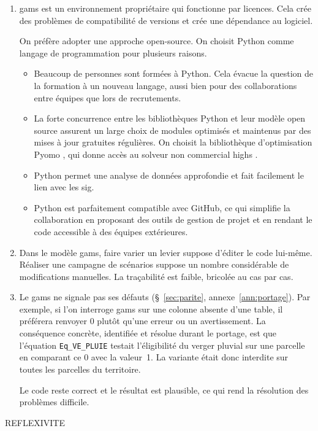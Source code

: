 \begin{enumerate}[leftmargin=1.6em,itemsep=6pt]

\item \gls{gams} est un environnement propriétaire qui fonctionne par licences. Cela crée des
problèmes de compatibilité de versions et crée une dépendance au logiciel.

On préfère adopter une approche open-source. On choisit Python comme langage de programmation
pour plusieurs raisons.

\begin{itemize}[leftmargin=1.2em,itemsep=3pt]
  \item Beaucoup de personnes sont formées à Python. Cela évacue la question de la formation à un
    nouveau langage, aussi bien pour des collaborations entre équipes que lors de recrutements.
  \item La forte concurrence entre les bibliothèques Python et leur modèle open source assurent
    un large choix de modules optimisés et maintenus par des mises à jour gratuites régulières.
    On choisit la bibliothèque d'optimisation Pyomo \parencite{pyomo2021}, qui donne accès au
    solveur non commercial \gls{highs} \parencite{highs2018}.
  \item Python permet une analyse de données approfondie et fait facilement le lien avec les
    \gls{sig}.
  \item Python est parfaitement compatible avec GitHub, ce qui simplifie la collaboration en
    proposant des outils de gestion de projet et en rendant le code accessible à des équipes
    extérieures.
\end{itemize}

\item Dans le modèle \gls{gams}, faire varier un levier suppose d'éditer le code lui-même.
Réaliser une campagne de scénarios suppose un nombre considérable de modifications manuelles. La
traçabilité est faible, bricolée au cas par cas.

\item Le \gls{gams} ne signale pas ses défauts (§~\ref{sec:parite},
annexe~\ref{ann:portage}). Par exemple, si l'on interroge \gls{gams} sur une colonne absente
d'une table, il préférera renvoyer \num{0} plutôt qu'une erreur ou un avertissement. La
conséquence concrète, identifiée et résolue durant le portage, est que l'équation
\texttt{Eq\_VE\_PLUIE} testait l'éligibilité du verger pluvial sur une parcelle en comparant ce
\num{0} avec la valeur~\num{1}. La variante était donc interdite sur toutes les parcelles du
territoire.

Le code reste correct et le résultat est plausible, ce qui rend la résolution des problèmes
difficile.

\end{enumerate}

\begin{reflexion}
REFLEXIVITE
\end{reflexion}
